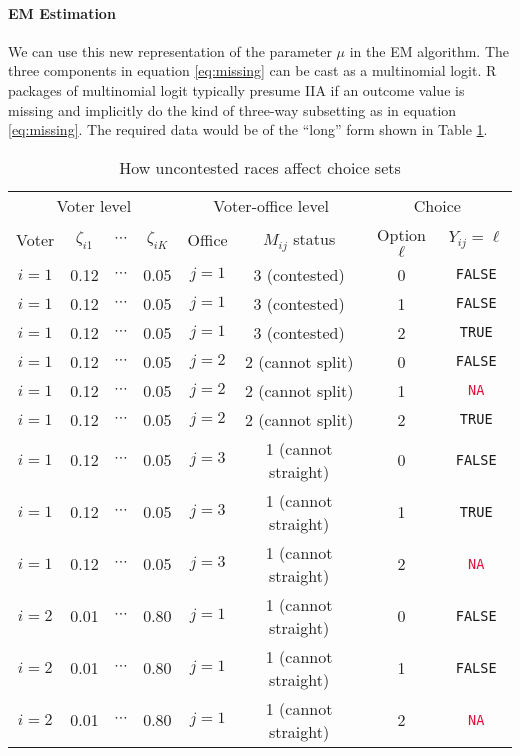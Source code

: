 \documentclass[11pt]{article}
\begin{document}
\paragraph{EM Estimation} We can use this new representation of the parameter \(\mu\) in the EM algorithm. The three components in equation \ref{eq:missing} can be cast as a multinomial logit. R packages of multinomial logit typically presume IIA if an outcome value is missing and implicitly do the kind of three-way subsetting as in equation \ref{eq:missing}. The required data would be of the ``long'' form shown in Table \ref{tab:choiceset}.

\begin{table}[!h]
\caption{How uncontested races affect choice sets \label{tab:choiceset}}
\centering
\singlespacing
\small
\begin{tabular}{cccccccc}
\toprule
\multicolumn{4}{c}{Voter level} & \multicolumn{2}{c}{Voter-office level} & \multicolumn{2}{c}{Choice}\\
\cmidrule(lr){1-4} \cmidrule(lr){5-6}\cmidrule(lr){7-8}
Voter     & \(\zeta_{i1}\) & \(\cdots\) & \(\zeta_{iK}\) &   Office & \(M_{ij}\) status & Option $\ell$ &  \(Y_{ij} = \ell\)\\\midrule
\(i = 1\) & 0.12 & \(\cdots\) & 0.05 &  \(j = 1\) & 3 (contested) & 0 & \texttt{FALSE}\\
\(i = 1\) & 0.12 & \(\cdots\) & 0.05 &  \(j = 1\) & 3 (contested) & 1 & \texttt{FALSE}\\
\(i = 1\) & 0.12 & \(\cdots\) & 0.05 &  \(j = 1\) & 3 (contested) & 2 & \texttt{TRUE}\\\addlinespace
\(i = 1\) & 0.12 & \(\cdots\) & 0.05 &  \(j = 2\) & 2 (cannot split) & 0 & \texttt{FALSE}\\
\(i = 1\) & 0.12 & \(\cdots\) & 0.05 &  \(j = 2\) & 2 (cannot split) & 1 & \textcolor{crimson}{\texttt{NA}}\\
\(i = 1\) & 0.12 & \(\cdots\) & 0.05 &  \(j = 2\) & 2 (cannot split) & 2 & \texttt{TRUE}\\\addlinespace
\(i = 1\) & 0.12 & \(\cdots\) & 0.05 &  \(j = 3\) & 1 (cannot straight) & 0 & \texttt{FALSE}\\
\(i = 1\) & 0.12 & \(\cdots\) & 0.05 &  \(j = 3\) & 1 (cannot straight) & 1 & \texttt{TRUE}\\
\(i = 1\) & 0.12 & \(\cdots\) & 0.05 &  \(j = 3\) & 1 (cannot straight) & 2 & \textcolor{crimson}{\texttt{NA}}\\\addlinespace
\(i = 2\) & 0.01 & \(\cdots\) & 0.80 &  \(j = 1\) & 1 (cannot straight) & 0 & \texttt{FALSE}\\
\(i = 2\) & 0.01 & \(\cdots\) & 0.80 &  \(j = 1\) & 1 (cannot straight) & 1 & \texttt{FALSE}\\
\(i = 2\) & 0.01 & \(\cdots\) & 0.80 &  \(j = 1\) & 1 (cannot straight) & 2 & \textcolor{crimson}{\texttt{NA}}\\
\bottomrule
\end{tabular}
\end{table}
\end{document}
